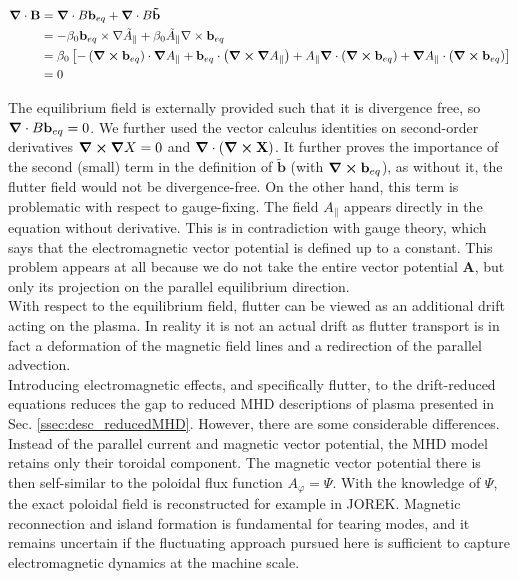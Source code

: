 \begin{align}
	\grad\cdot\mathbf{B} &= \grad\cdot B\mathbf{b}_{eq} + \grad\cdot B\mathbf{\tilde{b}} \nonumber \\
	&= -\beta_0\mathbf{b}_{eq} \times \nabla \tilde{A}_\parallel + \beta_0\tilde{A}_\parallel \nabla \times \mathbf{b}_{eq} \nonumber \\
	&= \beta_0\left[-\left(\grad\cross\mathbf{b}_{eq}\right)\cdot\grad A_\parallel + \mathbf{b}_{eq}\cdot\left(\grad\cross\grad A_\parallel\right) + A_\parallel\grad\cdot\left(\grad\cross\mathbf{b}_{eq}\right) + \grad A_\parallel\cdot\left(\grad\cross\mathbf{b}_{eq}\right)\right] \nonumber \\
	&= 0
\end{align}

The equilibrium field is externally provided such that it is divergence free, so $\grad\cdot B\mathbf{b}_{eq} = 0$. We further used the vector calculus identities on second-order derivatives $\grad\cross\grad X = 0$ and $\grad\cdot\left(\grad\cross\mathbf{X}\right)$. It further proves the importance of the second (small) term in the definition of $\mathbf{\tilde{b}}$ (with $\grad\cross\mathbf{b}_{eq}$), as without it, the flutter field would not be divergence-free. On the other hand, this term is problematic with respect to gauge-fixing. The field $A_\parallel$ appears directly in the equation without derivative. This is in contradiction with gauge theory, which says that the electromagnetic vector potential is defined up to a constant. This problem appears at all because we do not take the entire vector potential $\textbf{A}$, but only its projection on the parallel equilibrium direction. \\
 
With respect to the equilibrium field, flutter can be viewed as an additional drift acting on the plasma. In reality it is not an actual drift as flutter transport is in fact a deformation of the magnetic field lines and a redirection of the parallel advection. \\

Introducing electromagnetic effects, and specifically flutter, to the drift-reduced equations reduces the gap to reduced MHD descriptions of plasma presented in Sec. \ref{ssec:desc_reducedMHD}. However, there are some considerable differences. Instead of the parallel current and magnetic vector potential, the MHD model retains only their toroidal component. The magnetic vector potential there is then self-similar to the poloidal flux function $A_\varphi = \Psi$. With the knowledge of $\Psi$, the exact poloidal field is reconstructed for example in JOREK\cite{hoelzl2021jorek}. Magnetic reconnection and island formation is fundamental for tearing modes, and it remains uncertain if the fluctuating approach pursued here is sufficient to capture electromagnetic dynamics at the machine scale.  \\

